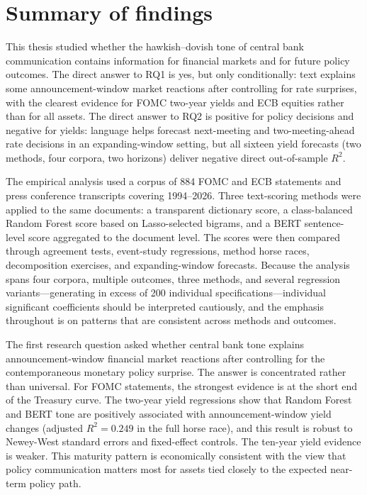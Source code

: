 
\section{Summary of findings}
\label{sec:conc_summary}

This thesis studied whether the hawkish--dovish tone of central bank
communication contains information for financial markets and for future policy
outcomes. The direct answer to RQ1 is yes, but only conditionally: text explains
some announcement-window market reactions after controlling for rate surprises,
with the clearest evidence for FOMC two-year yields and ECB equities rather than
for all assets. The direct answer to RQ2 is positive for policy decisions and
negative for yields: language helps forecast next-meeting and two-meeting-ahead
rate decisions in an expanding-window setting, but all sixteen yield forecasts
(two methods, four corpora, two horizons) deliver negative direct out-of-sample
$R^2$.

The empirical analysis used a corpus of 884 FOMC and ECB statements and press
conference transcripts covering 1994--2026. Three text-scoring methods were
applied to the same documents: a transparent dictionary score, a class-balanced
Random Forest score based on Lasso-selected bigrams, and a BERT
sentence-level score aggregated to the document level. The scores were then
compared through agreement tests, event-study regressions, method horse races,
decomposition exercises, and expanding-window forecasts. Because the analysis
spans four corpora, multiple outcomes, three methods, and several regression
variants---generating in excess of 200 individual specifications---individual
significant coefficients should be interpreted cautiously, and the emphasis
throughout is on patterns that are consistent across methods and outcomes.

The first research question asked whether central bank tone explains
announcement-window financial market reactions after controlling for the
contemporaneous monetary policy surprise. The answer is concentrated rather
than universal. For FOMC statements, the strongest evidence is at the short end
of the Treasury curve. The two-year yield regressions show that Random Forest
and BERT tone are positively associated with announcement-window yield
changes (adjusted $R^2 = 0.249$ in the full horse race), and this result is
robust to Newey-West standard errors and fixed-effect controls. The ten-year
yield evidence is weaker. This maturity pattern is economically consistent with
the view that policy communication matters most for assets tied closely to the
expected near-term policy path.

